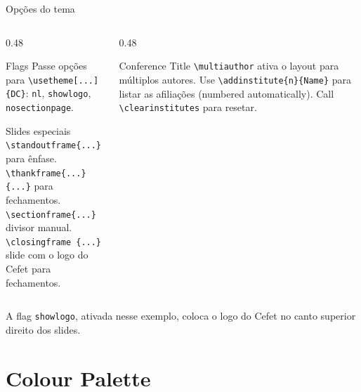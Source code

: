 \documentclass[aspectratio=169,10pt]{beamer}
\begin{document}
\begin{frame}{Opções do tema}
  \begin{columns}[T]
    \begin{column}{0.48\textwidth}
      \begin{block}{Flags} \footnotesize
        Passe opções para \texttt{\textbackslash usetheme[...]}\texttt{\{DC\}}:
        \texttt{nl}, \texttt{showlogo}, \texttt{nosectionpage}.
      \end{block}
      \vskip 6pt
      \begin{block}{Slides especiais} \footnotesize
        \texttt{\textbackslash standoutframe\{...\}} para ênfase.\\
        \texttt{\textbackslash thankframe\{...\}\{...\}} para fechamentos.\\
        \texttt{\textbackslash sectionframe\{...\}} divisor manual. \\
        \texttt{\textbackslash closingframe \{...\}} slide com o logo do Cefet para fechamentos.
      \end{block}
    \end{column}
    \begin{column}{0.48\textwidth} \footnotesize
      \begin{block}{Conference Title}
        \texttt{\textbackslash multiauthor} ativa o layout para múltiplos autores.
        Use \texttt{\textbackslash addinstitute\{n\}\{Name\}} para listar as afiliações
        (numbered automatically). Call \texttt{\textbackslash clearinstitutes} para resetar.
      \end{block}
    \end{column}
  \end{columns}

  \vskip 10pt
  A flag \texttt{showlogo}, ativada nesse exemplo, coloca o logo do Cefet no canto superior direito dos slides.
\end{frame}


\section{Colour Palette}
\end{document}
